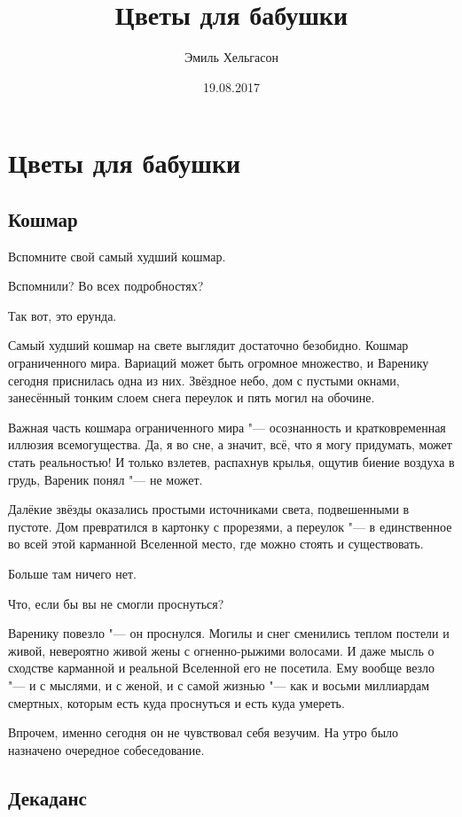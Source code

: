 \author{Эмиль Хельгасон}
\title{Цветы для бабушки}
\date{19.08.2017}
\maketitle

\tableofcontents

\chapter{Цветы для бабушки}

\section{Кошмар}

Вспомните свой самый худший кошмар.

Вспомнили?
Во всех подробностях?

Так вот, это ерунда.

Самый худший кошмар на свете выглядит достаточно безобидно.
Кошмар ограниченного мира.
Вариаций может быть огромное множество, и Варенику сегодня приснилась одна из них.
Звёздное небо, дом с пустыми окнами, занесённый тонким слоем снега переулок и пять могил на обочине.

Важная часть кошмара ограниченного мира "--- осознанность и кратковременная иллюзия всемогущества.
Да, я во сне, а значит, всё, что я могу придумать, может стать реальностью!
И только взлетев, распахнув крылья, ощутив биение воздуха в грудь, Вареник понял "--- не может.

Далёкие звёзды оказались простыми источниками света, подвешенными в пустоте.
Дом превратился в картонку с прорезями, а переулок "--- в единственное во всей этой карманной Вселенной место, где можно стоять и существовать.

Больше там ничего нет.

Что, если бы вы не смогли проснуться?

Варенику повезло "--- он проснулся.
Могилы и снег сменились теплом постели и живой, невероятно живой жены с огненно-рыжими волосами.
И даже мысль о сходстве карманной и реальной Вселенной его не посетила.
Ему вообще везло "--- и с мыслями, и с женой, и с самой жизнью "--- как и восьми миллиардам смертных, которым есть куда проснуться и есть куда умереть.

Впрочем, именно сегодня он не чувствовал себя везучим.
На утро было назначено очередное собеседование.

\section{Декаданс}

